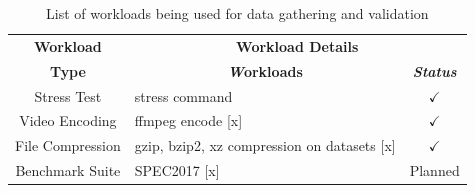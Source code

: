 \documentclass[conference]{IEEEtran}
\begin{document}
\begin{table}[htbp]
    \caption{List of workloads being used for data gathering and validation}
    \begin{center}
        \begin{tabular}{|c|p{4cm}|c|}
            \hline
            \textbf{Workload}&\multicolumn{2}{|c|}{\textbf{Workload Details}} \\
            \cline{2-3} 
            \textbf{Type} & \multicolumn{1}{|c|}{\textbf{\textit Workloads}} & \textbf{\textit{Status}} \\
            \hline
            Stress Test & stress command \cite{linux-stress-testing} & $\checkmark$ \\
            \hline
            Video Encoding & ffmpeg encode [x] & $\checkmark$ \\
            \hline
            File Compression & gzip, bzip2, xz compression on datasets [x] & $\checkmark$ \\
            \hline
            Benchmark Suite & SPEC2017 [x] & Planned \\
            \hline
        \end{tabular}
        \label{tab1}
    \end{center}
\end{table}
\newpage



\end{document}
